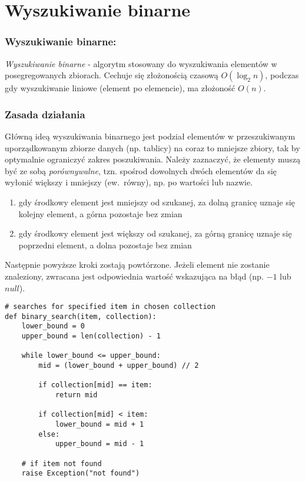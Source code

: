 \documentclass{beamer}
\begin{document}
    \section{Wyszukiwanie binarne}
    \begin{frame}
        \frametitle{Wyszukiwanie binarne:}
        \emph{Wyszukiwanie binarne} - algorytm stosowany do wyszukiwania
        elementów w posegregowanych zbiorach. Cechuje się złożonością czasową $O \left(\log_2 n \right)$, podczas gdy wyszukiwanie liniowe (element po elemencie), ma złożoność $O \left( n \right)$.
    \end{frame}
    \begin{frame}
        \frametitle{Zasada działania}
        Główną ideą wyszukiwania binarnego jest podział elementów w przeszukiwanym uporządkowanym zbiorze danych
        (np. tablicy) na coraz to mniejsze zbiory, tak by optymalnie ograniczyć zakres poszukiwania.
        Należy zaznaczyć, że elementy muszą być ze sobą \emph{porównywalne}, tzn. spośrod dowolnych dwóch elementów
        da się wyłonić większy i mniejszy (ew.~równy), np. po wartości lub nazwie.

        \begin{enumerate}
            \item gdy środkowy element jest mniejszy od szukanej, za dolną granicę uznaje się kolejny element, a górna pozostaje bez zmian
            \item gdy środkowy element jest większy od szukanej, za górną granicę uznaje się poprzedni element,
            a dolna pozostaje bez zmian
        \end{enumerate}

        Następnie powyższe kroki zostają powtórzone. Jeżeli element nie zostanie znaleziony,
        zwracana jest odpowiednia wartość wskazująca na błąd (np. $-1$ lub $null$).
    \end{frame}
    \begin{verbatim}
# searches for specified item in chosen collection
def binary_search(item, collection):
    lower_bound = 0
    upper_bound = len(collection) - 1

    while lower_bound <= upper_bound:
        mid = (lower_bound + upper_bound) // 2

        if collection[mid] == item:
            return mid

        if collection[mid] < item:
            lower_bound = mid + 1
        else:
            upper_bound = mid - 1

    # if item not found
    raise Exception("not found")
    \end{verbatim}
\end{document}
